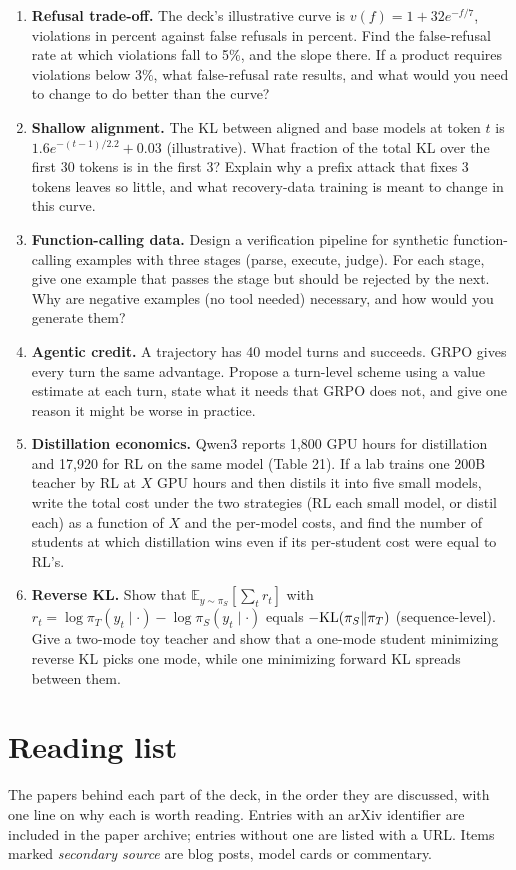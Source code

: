 \documentclass[11pt,letterpaper]{article}
\begin{document}
\begin{enumerate}[leftmargin=1.6em,itemsep=6pt]
\item \textbf{Refusal trade-off.} The deck's illustrative curve is $v(f)=1+32e^{-f/7}$, violations in percent against false refusals in percent. Find the false-refusal rate at which violations fall to 5\%, and the slope there. If a product requires violations below 3\%, what false-refusal rate results, and what would you need to change to do better than the curve?
\item \textbf{Shallow alignment.} The KL between aligned and base models at token $t$ is $1.6e^{-(t-1)/2.2}+0.03$ (illustrative). What fraction of the total KL over the first 30 tokens is in the first 3? Explain why a prefix attack that fixes 3 tokens leaves so little, and what recovery-data training is meant to change in this curve.
\item \textbf{Function-calling data.} Design a verification pipeline for synthetic function-calling examples with three stages (parse, execute, judge). For each stage, give one example that passes the stage but should be rejected by the next. Why are negative examples (no tool needed) necessary, and how would you generate them?
\item \textbf{Agentic credit.} A trajectory has 40 model turns and succeeds. GRPO gives every turn the same advantage. Propose a turn-level scheme using a value estimate at each turn, state what it needs that GRPO does not, and give one reason it might be worse in practice.
\item \textbf{Distillation economics.} Qwen3 reports 1,800 GPU hours for distillation and 17,920 for RL on the same model (Table 21). If a lab trains one 200B teacher by RL at $X$ GPU hours and then distils it into five small models, write the total cost under the two strategies (RL each small model, or distil each) as a function of $X$ and the per-model costs, and find the number of students at which distillation wins even if its per-student cost were equal to RL's.
\item \textbf{Reverse KL.} Show that $\mathbb{E}_{y\sim\pi_S}[\sum_t r_t]$ with $r_t=\log\pi_T(y_t\mid\cdot)-\log\pi_S(y_t\mid\cdot)$ equals $-\mathrm{KL}(\pi_S\|\pi_T)$ (sequence-level). Give a two-mode toy teacher and show that a one-mode student minimizing reverse KL picks one mode, while one minimizing forward KL spreads between them.
\end{enumerate}
\clearpage
\section{Reading list}
\label{app:reading}
The papers behind each part of the deck, in the order they are discussed, with one line on why each is worth reading. Entries with an arXiv identifier are included in the paper archive; entries without one are listed with a URL. Items marked \emph{secondary source} are blog posts, model cards or commentary.
\end{document}
